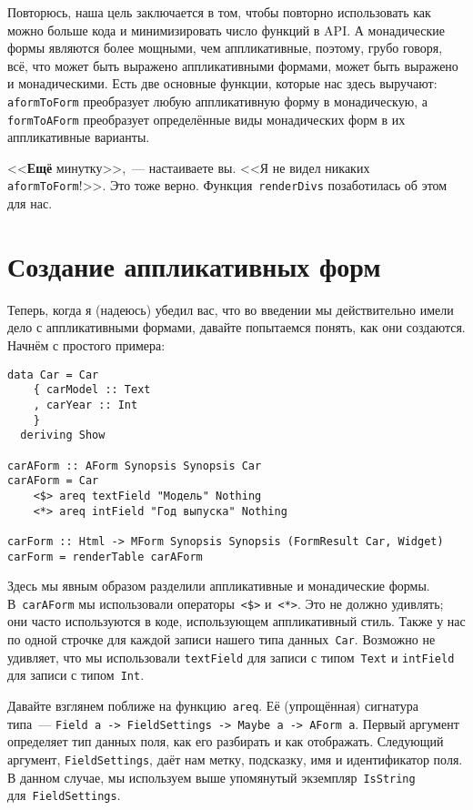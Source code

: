Повторюсь, наша цель заключается в том, чтобы повторно использовать как можно
больше кода и минимизировать число функций в API. А монадические формы
являются более мощными, чем аппликативные, поэтому, грубо говоря, всё, что
может быть выражено аппликативными формами, может быть выражено и
монадическими. Есть две основные функции, которые нас здесь выручают:
\lstinline'aformToForm' преобразует любую аппликативную форму в монадическую,
а \lstinline'formToAForm' преобразует определённые виды монадических форм в их
аппликативные варианты.

<<\textbf{Ещё} минутку>>,~--- настаиваете вы. <<Я не видел никаких
\lstinline'aformToForm'!>>. Это тоже верно.  Функция~\lstinline'renderDivs'
позаботилась об этом для нас.

\section{Создание аппликативных форм}
Теперь, когда я (надеюсь) убедил вас, что во введении мы действительно имели
дело с аппликативными формами, давайте попытаемся понять, как они создаются.
Начнём с простого примера:

\begin{lstlisting}
data Car = Car
    { carModel :: Text
    , carYear :: Int
    }
  deriving Show

carAForm :: AForm Synopsis Synopsis Car
carAForm = Car
    <$> areq textField "Модель" Nothing
    <*> areq intField "Год выпуска" Nothing

carForm :: Html -> MForm Synopsis Synopsis (FormResult Car, Widget)
carForm = renderTable carAForm
\end{lstlisting}%

Здесь мы явным образом разделили аппликативные и монадические формы.
В~\lstinline'carAForm' мы использовали операторы~\lstinline'<$>'%
и~\lstinline'<*>'. Это не должно удивлять; они часто используются в коде,
использующем аппликативный стиль. Также у нас по одной строчке для каждой
записи нашего типа данных~\lstinline'Car'. Возможно не удивляет, что мы
использовали \lstinline'textField' для записи с типом~\lstinline'Text' и
\lstinline'intField' для записи с типом~\lstinline'Int'.

Давайте взглянем поближе на функцию~\lstinline'areq'. Её (упрощённая)
сигнатура типа~--- \lstinline'Field a -> FieldSettings -> Maybe a -> AForm a'.
Первый аргумент определяет тип данных поля, как его разбирать и как
отображать.  Следующий аргумент, \lstinline'FieldSettings', даёт нам метку,
подсказку, имя и идентификатор поля. В данном случае, мы используем выше
упомянутый экземпляр~\lstinline'IsString' для~\lstinline'FieldSettings'.

